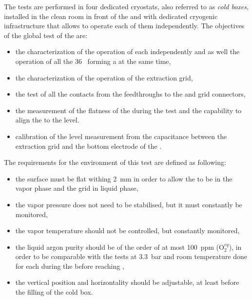 The tests are performed in four dedicated cryostats, also referred to as \emph{cold boxes}, installed in the clean room in front of the  and with dedicated cryogenic infrastructure that allows to operate each of them independently.
The objectives of the global test of the  are:
\begin{itemize}
\item the characterization of the  operation of each  independently and as well the  operation of all the 36~ forming a  at the same time,
\item the characterization of the  operation of the extraction grid,
\item the test of all the  contacts from the feedthroughs to the  and grid connectors,
\item the measurement of the flatness of the  during the test and the capability to align the  to the  level.
\item calibration of the level measurement from the capacitance between the extraction grid and the bottom electrode of the .
\end{itemize}

The requirements for the environment of this test are defined as following:
\begin{itemize}
\item the  surface must be flat withing 2~mm in order to allow the  to be in the vapor phase and the grid in liquid phase,
\item the vapor pressure does not need to be stabilised, but it must constantly be monitored,
\item the vapor temperature should not be controlled, but constantly monitored,
\item the liquid argon purity should be of the order of at most 100~ppm (O$_2^{eq}$), in order to be comparable with the tests at 3.3~bar and room temperature done for each  during the  before reaching \surf,
\item the  vertical position and horizontality should be adjustable, at least before the filling of the cold box.
\end{itemize}

